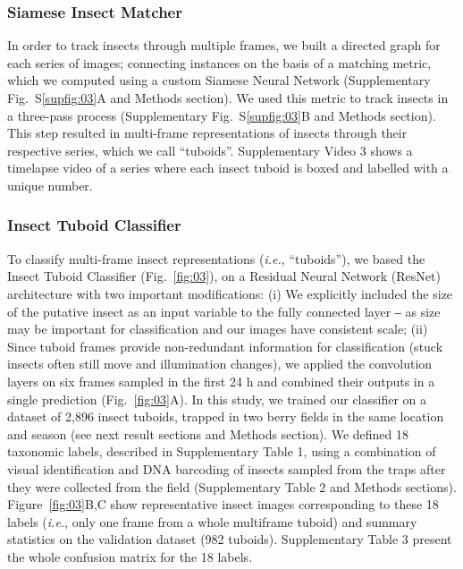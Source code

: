 \documentclass[12pt]{article}
\begin{document}
\begin{linenumbers}
		\subsubsection*{Siamese Insect Matcher}
		In order to track insects through multiple frames, we built a directed graph for each series of images; connecting instances on the basis of a matching metric, which we computed using a custom Siamese Neural Network (Supplementary Fig.~S\ref{supfig:03}A and Methods section). We used this metric to track insects in a three-pass process (Supplementary Fig.~S\ref{supfig:03}B and Methods section). This step resulted in multi-frame representations of insects through their respective series, which we call “tuboids”. Supplementary Video 3 shows a timelapse video of a series where each insect tuboid is boxed and labelled with a unique number.

		\subsubsection*{Insect Tuboid Classifier}

		To classify multi-frame insect representations (\emph{i.e.}, “tuboids”), we based the Insect Tuboid Classifier (Fig.~\ref{fig:03}), on a Residual Neural Network (ResNet) architecture\cite{he_deep_2016} with two important modifications: (i) We explicitly included the size of the putative insect as an input variable to the fully connected layer ‒ as size may be important for classification and our images have consistent scale; (ii) Since tuboid frames provide non-redundant information for classification (stuck insects often still move and illumination changes), we applied the convolution layers on six frames sampled in the first 24 h and combined their outputs in a single prediction (Fig.~\ref{fig:03}A). In this study, we trained our classifier on a dataset of 2,896 insect tuboids, trapped in two berry fields in the same location and season (see next result sections and Methods section). We defined 18 taxonomic labels, described in Supplementary Table 1, using a combination of visual identification and DNA barcoding of insects sampled from the traps after they were collected from the field (Supplementary Table 2 and Methods sections). Figure~\ref{fig:03}B,C show representative insect images corresponding to these 18 labels (\emph{i.e.}, only one frame from a whole multiframe tuboid) and summary statistics on the validation dataset (982 tuboids).
		Supplementary Table 3 present the whole confusion matrix for the 18 labels.


\end{linenumbers}
\end{document}

